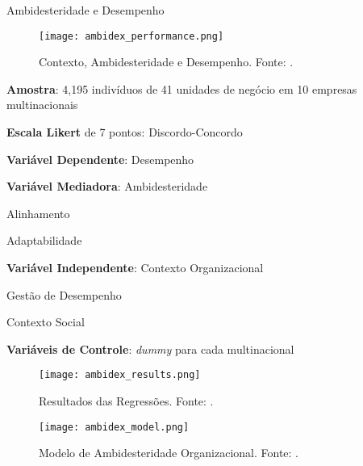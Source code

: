 \begin{frame}{Ambidesteridade e Desempenho}
	\begin{figure}
		\centering
		\texttt{[image: ambidex\_performance.png]}
		\caption{Contexto, Ambidesteridade e Desempenho. Fonte: \textcite{gibson2004antecedents}.}
		\label{fig:ambidex_performance}
	\end{figure}
\end{frame}

\begin{frame}{\textcite{gibson2004antecedents}}
	\begin{vfilleditems}
	\item \textbf{Amostra}: 4,195 indivíduos de 41 unidades de negócio em 10 empresas multinacionais
	\item \textbf{Escala Likert} de 7 pontos: Discordo-Concordo
	\item \textbf{Variável Dependente}: Desempenho
	\item \textbf{Variável Mediadora}: Ambidesteridade
		\begin{vfilleditems}
		\item Alinhamento
		\item Adaptabilidade
		\end{vfilleditems}
	\item \textbf{Variável Independente}: Contexto Organizacional
		\begin{vfilleditems}
		\item Gestão de Desempenho
		\item Contexto Social
		\end{vfilleditems}
	\item \textbf{Variáveis de Controle}: \textit{dummy} para cada multinacional	
	\end{vfilleditems}
\end{frame}

\begin{frame}{\textcite{gibson2004antecedents}}
	\begin{figure}
		\centering
		\texttt{[image: ambidex\_results.png]}
		\caption{Resultados das Regressões. Fonte: \textcite{gibson2004antecedents}.}
		\label{fig:ambidex_results}
	\end{figure}
\end{frame}

\begin{frame}{\textcite{raisch2008organizational}}
	\begin{figure}
		\centering
		\texttt{[image: ambidex\_model.png]}
		\caption{Modelo de Ambidesteridade Organizacional. Fonte: \textcite{raisch2008organizational}.}
		\label{fig:ambidex_model}
	\end{figure}
\end{frame}

